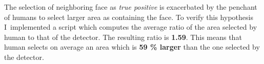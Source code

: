 The selection of neighboring face as \textit{true positive} is exacerbated by the penchant of humans to select larger
area as containing the face.
To verify this hypothesis I implemented a script which computes the average ratio of the area selected by human
to that of the detector.
The resulting ratio is \textbf{1.59}.
This means that human selects on average an area which is \textbf{59 \% larger} than the one selected by the detector.